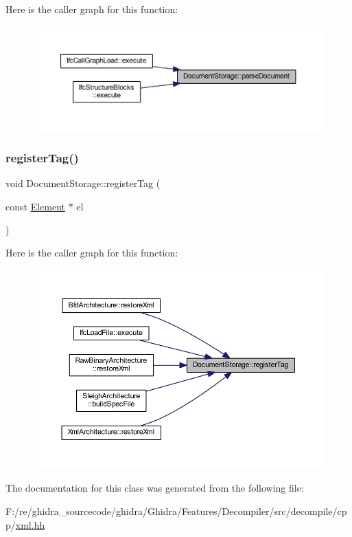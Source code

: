 Here is the caller graph for this function\+:
\nopagebreak
\begin{figure}[H]
\begin{center}
\leavevmode
\includegraphics[width=350pt]{class_document_storage_a25cfe61f8b2cb67d621c46ae0104f84e_icgraph}
\end{center}
\end{figure}
\mbox{\label{class_document_storage_a0f74401ca5bd1e2f40ccb93ba1cf5349}} 
\subsubsection{\texorpdfstring{registerTag()}{registerTag()}}
{\footnotesize\ttfamily void Document\+Storage\+::register\+Tag (\begin{DoxyParamCaption}\item[{const \mbox{\hyperlink{class_element}{Element}} $\ast$}]{el }\end{DoxyParamCaption})}

Here is the caller graph for this function\+:
\nopagebreak
\begin{figure}[H]
\begin{center}
\leavevmode
\includegraphics[width=350pt]{class_document_storage_a0f74401ca5bd1e2f40ccb93ba1cf5349_icgraph}
\end{center}
\end{figure}


The documentation for this class was generated from the following file\+:\begin{DoxyCompactItemize}
\item 
F\+:/re/ghidra\+\_\+sourcecode/ghidra/\+Ghidra/\+Features/\+Decompiler/src/decompile/cpp/\mbox{\hyperlink{xml_8hh}{xml.\+hh}}\end{DoxyCompactItemize}
